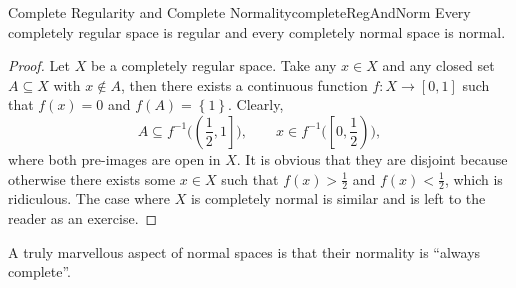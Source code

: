 \documentclass[math]{amznotes}
\theoremstyle{remark}
\begin{document}
\begin{probox}{Complete Regularity and Complete Normality}{completeRegAndNorm}
    Every completely regular space is regular and every completely normal space is normal.
    \tcblower
    \begin{proof}
        Let $X$ be a completely regular space. Take any $x \in X$ and any closed set $A \subseteq X$ with $x \notin A$, then there exists a continuous function $f \colon X \to \left[0, 1\right]$ such that $f\left(x\right) = 0$ and $f\left(A\right) = \left\{1\right\}$. Clearly, 
        \begin{equation*}
            A \subseteq f^{-1}\biggl(\left(\frac{1}{2}, 1\right]\biggr), \qquad x \in f^{-1}\biggl(\left[0, \frac{1}{2}\right)\biggr),
        \end{equation*}
        where both pre-images are open in $X$. It is obvious that they are disjoint because otherwise there exists some $x \in X$ such that $f\left(x\right) > \frac{1}{2}$ and $f\left(x\right) < \frac{1}{2}$, which is ridiculous. The case where $X$ is completely normal is similar and is left to the reader as an exercise.
    \end{proof}
\end{probox}
A truly marvellous aspect of normal spaces is that their normality is ``always complete''.
\end{document}
